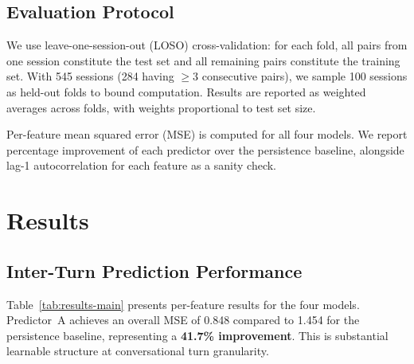 \documentclass[twoside,11pt]{article}
\begin{document}
\subsection{Evaluation Protocol}
\label{sec:method-eval}

We use leave-one-session-out (LOSO) cross-validation: for each fold, all pairs
from one session constitute the test set and all remaining pairs constitute the
training set. With 545 sessions (284 having $\geq$3 consecutive pairs), we
sample 100 sessions as held-out folds to bound computation. Results are reported
as weighted averages across folds, with weights proportional to test set size.

Per-feature mean squared error (MSE) is computed for all four models. We report
percentage improvement of each predictor over the persistence baseline,
alongside lag-1 autocorrelation for each feature as a sanity check.


\section{Results}
\label{sec:results}

\subsection{Inter-Turn Prediction Performance}
\label{sec:results-interturn}

Table~\ref{tab:results-main} presents per-feature results for the four models.
Predictor~A achieves an overall MSE of 0.848 compared to 1.454 for the
persistence baseline, representing a \textbf{41.7\% improvement}. This is
substantial learnable structure at conversational turn granularity.
\end{document}
